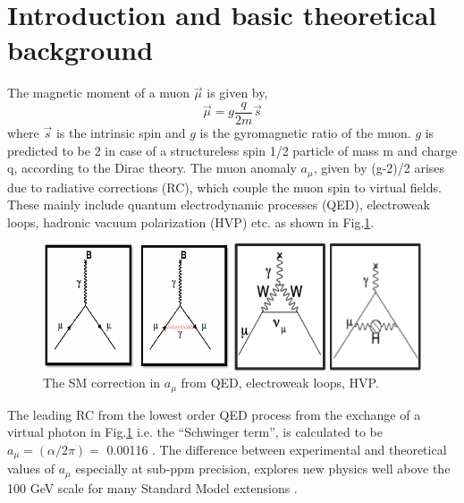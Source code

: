 \documentclass[journal,article,submit,moreauthors,pdftex,10pt,a4paper]{Definitions/mdpi}
\begin{document}
\setcounter{section}%

\section{Introduction and basic theoretical background}
\noindent
The magnetic moment of a muon $\vec{\mu}$ is given by, 
\begin{equation}
\vec{\mu} = g \frac{q} {2 m}\vec{s}
\end{equation}
where $\vec{s}$ is the intrinsic spin and $g$ is the gyromagnetic ratio of the muon. 
$g$ is predicted to be 2 in case of a 
structureless spin 1/2 particle of mass m and charge q, according to the Dirac theory.
The muon anomaly $a_{\mu}$, given by (g-2)/2 arises due to radiative corrections (RC), which couple the
muon spin to virtual fields. These mainly include quantum electrodynamic processes
(QED), electroweak loops, hadronic vacuum polarization (HVP) etc. as shown in
Fig.\ref{fig1}.

\begin{figure}[H]
\centering
\includegraphics[width=9 cm]{a_mu_corrections.png}
\caption{\label{fig1}The SM correction in $a_{\mu}$ from QED, electroweak loops, HVP. }
\end{figure} 

The leading RC from the lowest order QED process from the exchange of a virtual
photon in Fig.\ref{fig1} i.e. the ``Schwinger term'', is calculated to be $a_{\mu} = (\alpha/2\pi) =$
0.00116 \cite{schwinger}. The difference between experimental and theoretical values of $a_{\mu}$
especially at sub-ppm precision, explores new physics well above the 100 GeV scale
for many Standard Model extensions \cite{benn}. 
\end{document}
